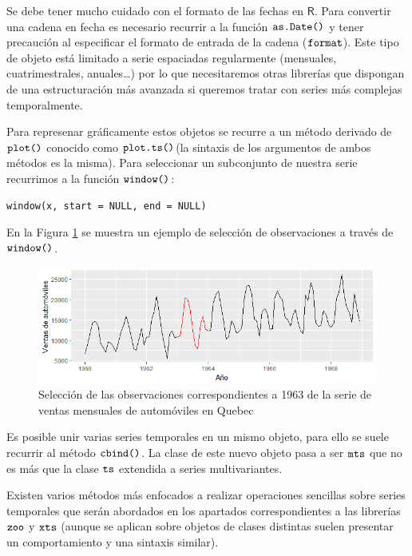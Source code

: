 Se debe tener mucho cuidado con el formato de las fechas en $\textsf{R}$. Para convertir una cadena en fecha es necesario recurrir a la función $\verb!as.Date()!$ y tener precaución al especificar el formato de entrada de la cadena ($\verb!format!$). Este tipo de objeto está limitado a serie espaciadas regularmente (mensuales, cuatrimestrales, anuales…) por lo que necesitaremos otras librerías que dispongan de una estructuración más avanzada si queremos tratar con series más complejas temporalmente.

Para represenar gráficamente estos objetos se recurre a un método  derivado de $\verb!plot()!$ conocido como $\verb!plot.ts()!$(la sintaxis de los argumentos de ambos métodos es la misma). Para seleccionar un subconjunto de nuestra serie recurrimos a la función $\verb!window()!$:
\begin{Verbatim}[fontsize=\footnotesize]
    window(x, start = NULL, end = NULL)
\end{Verbatim}

En la Figura \ref{window} se muestra un ejemplo de selección de observaciones a través de $\verb!window()!$.
\begin{figure}
    \centering
    \centerline{\includegraphics[scale = 0.7]{Images/Estructura/window.png}}
    \caption{Selección de las observaciones correspondientes a 1963 de la serie de ventas mensuales de automóviles en Quebec}
    \label{window}
\end{figure}

Es posible unir varias series temporales en un mismo objeto, para ello se suele recurrir al método $\verb!cbind()!$. La clase de este nuevo objeto pasa a ser $\verb!mts!$ que no es más que la clase $\verb!ts!$ extendida a series multivariantes.

Existen varios métodos más enfocados a realizar operaciones sencillas sobre series temporales que serán abordados en los apartados correspondientes a las librerías $\verb!zoo!$ y $\verb!xts!$ (aunque se aplican sobre objetos de clases distintas suelen presentar un comportamiento y una sintaxis similar).


